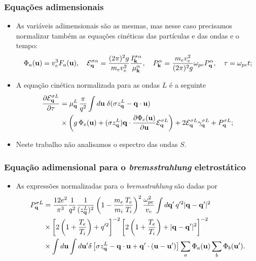 \documentclass[10pt,aspectratio=1610,lualatex]{beamer}
\begin{document}
\begin{frame}
  \frametitle{Equações adimensionais}
  \begin{itemize}
    \item As variáveis adimensionais são as mesmas, mas nesse
    caso precisamos normalizar também as equações cinéticas das
    partículas e das ondas e o tempo:
    \begin{align*}
      \Phi_a({\bf u})=  v_e^3 F_a({\bf u}),
      \quad {\cal E}_{\bf q}^{\sigma\alpha}
      = \frac{(2\pi)^2 g}{m_ev_e^2}
      \frac{I_{\bf k}^{\sigma\alpha}}{\mu_{\bf k}^\alpha},
      \quad  P_{\bf k}^\alpha=\frac{m_ev_e^2}{(2\pi)^2g}
      \omega_{pe}P_{\bf q}^\alpha,
      \quad \tau = \omega_{pe}t;
    \end{align*}
    \item A equação cinética normalizada para as ondas $L$ é a
    seguinte
    \begin{equation*}
      \begin{split}
	\frac{\partial{\cal E}_{\bf q}^{\sigma L}}{\partial\tau}
	&=\mu_{\bf q}^L\,\frac{\pi}{q^2}\int d{\bf u}\;
	\delta(\sigma z_{\bf q}^L-{\bf q}\cdot{\bf u})\\
	&\times\biggl(g\,\Phi_e({\bf u})+(\sigma z_{\bf q}^L)
	{\bf q}\cdot\frac{\partial \Phi_e({\bf u})}{\partial{\bf u}}
	{\cal E}_{\bf q}^{\sigma L}\biggr) +2{\cal E}_{\bf q}^{\sigma L}
	\gamma_{\bf q}^{\sigma L}+P_{\bf q}^{\sigma L};
      \end{split}
    \end{equation*}
    \item Neste trabalho não analisamos o espectro das ondas $S$.
  \end{itemize}
\end{frame}

\begin{frame}
  \frametitle{Equação adimensional para o \emph{bremsstrahlung}
    eletrostático}
  \begin{itemize}
    \item As expressões normalizadas para o \emph{bremsstrahlung} são dadas por
    \begin{equation*}
      \begin{split}
	P_{\bf q}^{\sigma L} &= \frac{12e^2}{\pi^3}
	\frac{1}{q^2}\frac{1}{(z_{\bf q}^L)^2}
	\left(1-\frac{m_e}{m_i}\frac{T_e}{T_i}\right)^2
	\frac{\omega_{pe}^2}{v_e}\int d{\bf q'}\,q'^2|{\bf q-q'}|^2\\
	&\times \left[2\left(1+\frac{T_e}{T_i}\right)+q'^2\right]^{-2}
	\left[2\left(1+\frac{T_e}{T_i}\right) +|{\bf q-q'}|^2\right]^{-2}\\
	&\times \int d{\bf u}\int d{\bf u'} \delta \left[ \sigma
	  z_{\bf q}^L-{\bf q\cdot u} +{\bf q'}\cdot ({\bf u-u'})\right]
	\sum_a \Phi_a({\bf u})\sum_b \Phi_b({\bf u'}).
      \end{split}
    \end{equation*}
  \end{itemize}
\end{frame}
\end{document}
